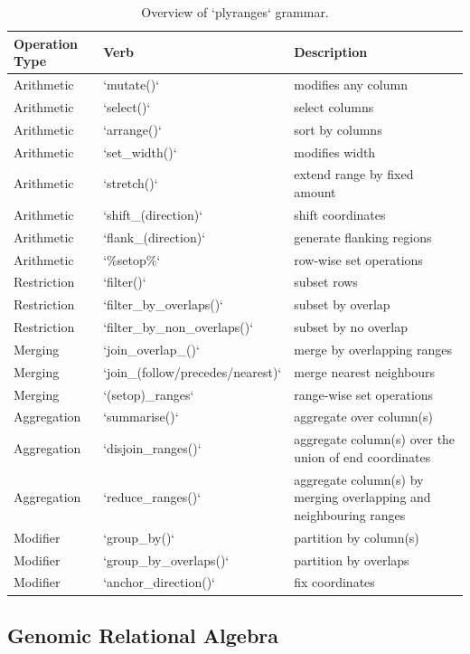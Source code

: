\documentclass[10pt,letterpaper]{article}
\begin{document}
\begin{table}[ht]
\label{tab:grammar}
\centering
\begin{tabular}{|l|l|p{4cm}|}
  \hline
Operation Type & Verb &  Description \\ 
  \hline
  Arithmetic &  `mutate()` & modifies any column \\
  Arithmetic & `select()` & select columns \\
  Arithmetic & `arrange()` & sort by columns \\
  Arithmetic & `set\_width()` & modifies width \\
  Arithmetic & `stretch()` & extend range by fixed amount \\
  Arithmetic & `shift\_(direction)` & shift coordinates \\
  Arithmetic & `flank\_(direction)` & generate flanking regions \\
  Arithmetic & `\%setop\%` & row-wise set operations \\
  Restriction & `filter()` & subset rows \\
  Restriction & `filter\_by\_overlaps()` & subset by overlap \\
  Restriction & `filter\_by\_non\_overlaps()` & subset by no overlap \\
  Merging & `join\_overlap\_()` & merge by overlapping ranges \\
  Merging & `join\_(follow/precedes/nearest)` & merge nearest neighbours \\
  Merging & `(setop)\_ranges` & range-wise set operations \\
  Aggregation & `summarise()` & aggregate over column(s) \\ 
  Aggregation & `disjoin\_ranges()` & aggregate column(s) over the union of end coordinates \\
  Aggregation & `reduce\_ranges()` & aggregate column(s) by merging overlapping and neighbouring ranges \\
  Modifier & `group\_by()` & partition by column(s)  \\ 
  Modifier & `group\_by\_overlaps()` & partition by overlaps \\
  Modifier & `anchor\_direction()` & fix coordinates \\
   \hline
\end{tabular}
\caption{Overview of `plyranges` grammar.}
\end{table}

\subsection{Genomic Relational
Algebra}\label{genomic-relational-algebra}
\end{document}
